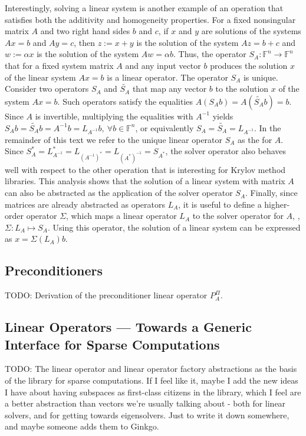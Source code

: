 Interestingly, solving a linear system is another example of an operation
that satisfies both the additivity and homogeneity properties. For a fixed
nonsingular matrix $A$ and two right hand sides $b$ and $c$, if $x$
and $y$ are solutions of the systems $Ax = b$ and $Ay = c$, then $z := x + y$ is
the solution of the system $Az = b + c$ and $w := \alpha x$ is the solution of
the system $Aw = \alpha b$. Thus, the operator $S_A : \mathbb{F}^n \rightarrow
\mathbb{F}^n$ that for a fixed system matrix $A$ and any input vector $b$
produces the solution $x$ of the linear system $Ax = b$ is a linear operator.
The operator $S_A$ is unique. Consider two operators $S_A$ and $\widetilde{S_A}$
that map any vector $b$ to the solution $x$ of the system $Ax = b$.
Such operators satisfy the equalities $A(S_Ab) = A(\widetilde{S_A}b) = b$. Since
$A$ is invertible, multiplying the equalities with $A^{-1}$ yields $S_Ab =
\widetilde{S_A}b = A^{-1}b = L_{A^{-1}}b, \ \forall b \in \mathbb{F}^n$, or
equivalently $S_A = \widetilde{S_A} = L_{A^{-1}}$. In the remainder of this
text we refer to the unique linear operator $S_A$ as the  for $A$. Since $S_A^* = L_{A^{-1}}^* = L_{(A^{-1})^*} = L_{(A^*)^{-1}}
= S_{A^*}$, the solver operator also behaves well with respect to the other
operation that is interesting for Krylov method libraries. This analysis shows
that the solution of a linear system with matrix $A$ can also be abstracted as
the application of the solver operator $S_A$. Finally, since matrices are
already abstracted as operators $L_A$, it is useful to define a higher-order
operator $\Sigma$, which maps a linear operator $L_A$ to the solver operator for
$A$, \ie, $\Sigma : L_A \mapsto S_A$. Using this operator, the solution of a
linear system can be expressed as $x = \Sigma(L_A)b$.

\subsection{Preconditioners}
TODO: Derivation of the preconditioner linear operator $P^\Pi_A$.

\subsection{Linear Operators --- Towards a Generic Interface for Sparse
            Computations}
TODO: The linear operator and linear operator factory abstractions as the basis
      of the library for sparse computations.
      If I feel like it, maybe I add the new ideas I have about having subspaces
      as first-class citizens in the library, which I feel are a better
      abstraction than vectors we're usually talking about - both for linear
      solvers, and for getting towards eigensolvers. Just to write it down
      somewhere, and maybe someone adds them to Ginkgo.
